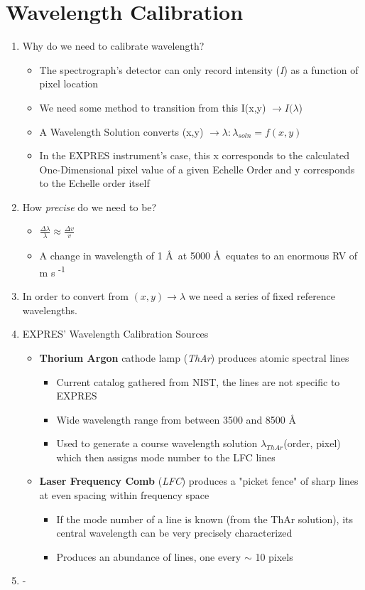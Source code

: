 \chapter{Wavelength Calibration} \label{chapter:Wavelength Calibration}
\begin{enumerate}
\item Why do we need to calibrate wavelength?
\begin{itemize}
\item The spectrograph's detector can only record intensity (\textit{I}) as a function of pixel location 
\item We need some method to transition from this I(x,y) $\rightarrow I(\lambda$)
\item A Wavelength Solution converts (x,y) $\rightarrow \lambda : \lambda_{soln} = f(x,y)$
\item In the EXPRES instrument's case, this x corresponds to the calculated One-Dimensional pixel value of a given Echelle Order and y corresponds to the Echelle order itself
\end{itemize}

\item How \textit{precise} do we need to be?
\begin{itemize}
\item $\frac{\Delta \lambda}{\lambda} \approx \frac{\Delta v}{v}$
\item A change in wavelength of 1 \AA\ at 5000 \AA\ equates to an enormous RV of m s \textsuperscript{-1}
\end{itemize}
\item In order to convert from $(x,y) \rightarrow \lambda$ we need a series of fixed reference wavelengths.
\item EXPRES' Wavelength Calibration Sources

\begin{itemize}
\item \textbf{Thorium Argon} cathode lamp (\textit{ThAr})  produces atomic spectral lines
\begin{itemize}
\item Current catalog gathered from NIST, the lines are not specific to EXPRES
\item Wide wavelength range from between 3500 and 8500 \AA\
\item Used to generate a course wavelength solution $\lambda_{ThAr}$(order, pixel) which then assigns mode number to the LFC lines
\end{itemize}
\item \textbf{Laser Frequency Comb} (\textit{LFC}) produces a "picket fence" of sharp lines at even spacing within frequency space
\begin{itemize}
\item If the mode number of a line is known (from the ThAr solution), its central wavelength can be very precisely characterized
\item Produces an abundance of lines, one every $\sim$ 10 pixels
\end{itemize}

\end{itemize}
\item -
\end{enumerate}

